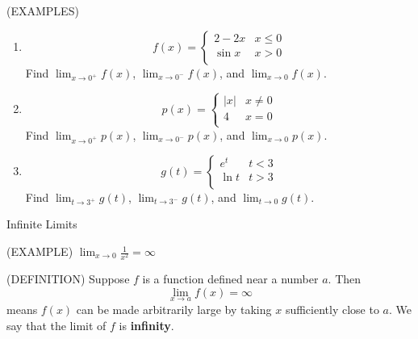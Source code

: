 \documentclass[11pt]{article}
\begin{document}
\vspace{.5in}

(EXAMPLES)
\begin{enumerate}

\item{
  \begin{displaymath}
f(x) =   \left\{ \begin{array}{ll}
 2-2x & x \le 0 \\
\sin{x} & x > 0\\
\end{array} \right.
  \end{displaymath}
Find $\lim_{x\to 0^+}f(x)$, $\lim_{x\to 0^-}f(x)$, and $\lim_{x\to 0}f(x)$.
}

  \vspace{1.5in}
  
\item{
  \begin{displaymath}
p(x) =   \left\{ \begin{array}{ll}
 |x| & x \neq 0 \\
4 & x = 0\\
\end{array} \right.
  \end{displaymath}
Find $\lim_{x\to 0^+}p(x)$, $\lim_{x\to 0^-}p(x)$, and $\lim_{x\to 0}p(x)$.
}

  
  \vspace{1.5in}
  
  \item{
  \begin{displaymath}
g(t) =   \left\{ \begin{array}{ll}
e^t &  t < 3\\
\ln{t} & t > 3\\
\end{array} \right.
  \end{displaymath}
Find $\lim_{t\to 3^+}g(t)$, $\lim_{t\to 3^-}g(t)$, and $\lim_{t\to 0}g(t)$.
}

\end{enumerate}


\pagebreak


\begin{center}
\Large
\rm{Infinite Limits}
\end{center}

(EXAMPLE) $\lim_{x\to 0}\frac{1}{x^2} = \infty $  \\

\vspace{1in}

(DEFINITION)  Suppose $f$ is a function defined near a number $a$.  Then 
\begin{displaymath}
  \lim_{x\to a}f(x) = \infty
  \end{displaymath}
means $f(x)$ can be made arbitrarily large  by taking $x$ sufficiently close to $a$.  We say that the limit of $f$ is {\bf infinity}.
\end{document}
